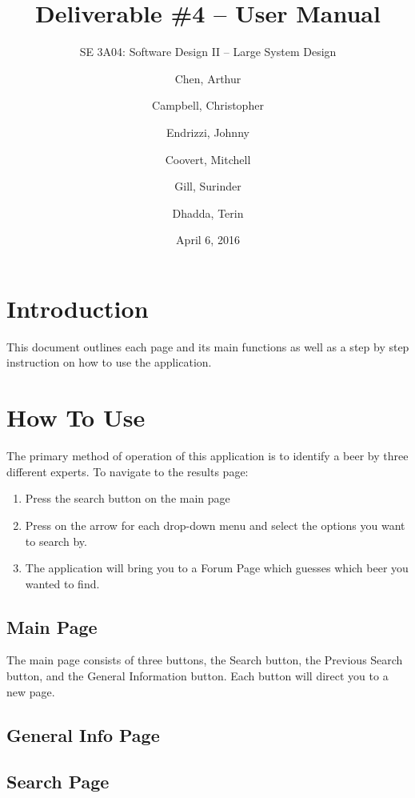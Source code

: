 \documentclass[]{article}
\title{Deliverable \#4 -- User Manual}
\author{SE 3A04: Software Design II -- Large System Design}
\author{Chen, Arthur \and Campbell, Christopher \and Endrizzi, Johnny \\ 
\and Coovert, Mitchell \and Gill, Surinder \and Dhadda, Terin}
\date {April 6, 2016}
\begin{document}
\maketitle	
\newpage
\tableofcontents
\listoffigures
\listoftables
\newpage

\section{Introduction}
\label{sec:introduction}
This document outlines each page and its main functions as well as a step by step instruction on how to use the application.

\section{How To Use}
The primary method of operation of this application is to identify a beer by three different experts. To navigate to the results page:
\begin{enumerate}
\item Press the search button on the main page
\item Press on the arrow for each drop-down menu and select the options you want to search by.
\item The application will bring you to a Forum Page which guesses which beer you wanted to find.

\end{enumerate}

\subsection{Main Page}

The main page consists of three buttons, the Search button, the Previous Search button, and the General Information button.
Each button will direct you to a new page.

\subsection{General Info Page}

\subsection{Search Page}
\end{document}
